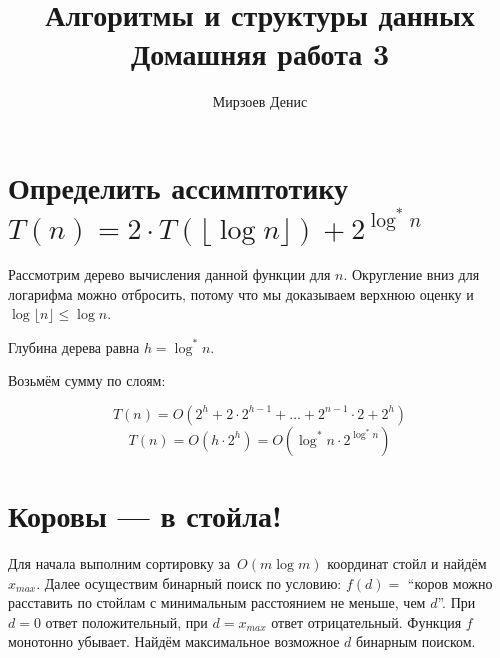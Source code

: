 \documentclass{article}
\title{Алгоритмы и структуры данных\\Домашняя работа 3}
\author{Мирзоев Денис}
\date{}
\begin{document}
\maketitle

\section {Определить ассимптотику\\ $T(n) = 2\cdot T(\lfloor \log n \rfloor)+2^{\log^* n}$}

Рассмотрим дерево вычисления данной функции для $n$. Округление вниз для
логарифма можно отбросить, потому что мы доказываем верхнюю оценку и $\log
{\lfloor n \rfloor} \leq \log n$.


Глубина дерева равна $h = \log^* n$. 

Возьмём сумму по слоям:

$$T(n) = O(2^h + 2 \cdot 2^{h-1} + \ldots + 2^{n-1} \cdot 2 + 2^h)$$
$$T(n) = O(h \cdot 2^h) = O(\log^* n \cdot 2^{\log^* n})$$

\pagebreak

\section{Коровы --- в стойла!}

Для начала выполним сортировку за~$O(m \log m)$ координат стойл и
найдём~$x_{max}$.  Далее осуществим бинарный поиск по условию: $f(d) = $
``коров можно расставить по стойлам с минимальным расстоянием не меньше, чем
$d$''. При $d = 0$ ответ положительный, при $d = x_{max}$ ответ отрицательный.
Функция $f$ монотонно убывает. Найдём максимальное возможное $d$ бинарным
поиском. 
\end{document}
